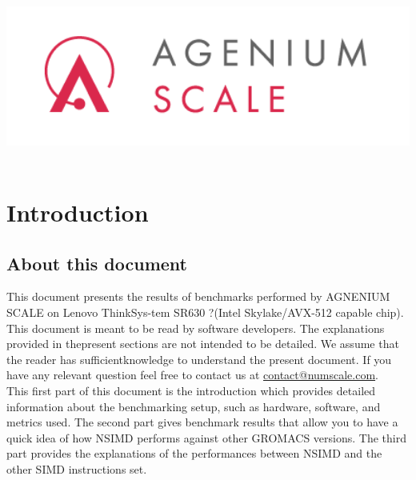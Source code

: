 
\usepackage{listings}
\usepackage{algorithm}
\usepackage{amsmath} 
\usepackage{algorithmic}

\usepackage[T1]{fontenc}
\usepackage[utf8]{inputenc}
\usepackage{multicol}


\title{\includegraphics[width=27em]{tex/scale.png}}

\maketitle
\clearpage
{}

\begin{flushright}\textit{}\end{flushright}


\tableofcontents
\newpage
\section{Introduction} %
	\subsection{About this document}
 This document presents the results of benchmarks performed by AGNENIUM SCALE on Lenovo ThinkSys-tem SR630 ?(Intel Skylake/AVX-512 capable chip).\\
 
	This document is meant to be read by software developers.  The explanations provided in thepresent  sections  are  not  intended  to  be  detailed.   We  assume  that  the  reader  has  sufficientknowledge to understand the present document.  If you have any relevant question feel free to contact us at \href{contact@numscale.com}{contact@numscale.com}. \\
 
 This first part of this document is the introduction which provides detailed information about the benchmarking setup, such as hardware, software, and metrics used.  The second part gives benchmark results that allow you to have a quick idea of how NSIMD performs against other GROMACS versions. The third part provides the explanations of the performances between NSIMD and the other SIMD instructions set.
 
